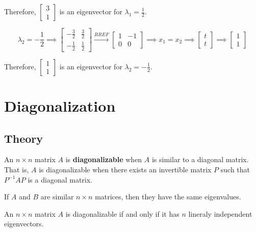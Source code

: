 \documentclass{report}
\begin{document}
\noindent Therefore, $\begin{bmatrix} 3 \\ 1 \end{bmatrix}$ is an eigenvector for $\lambda_1 = \frac{1}{2}$.

$$
\lambda_2 = -\frac{1}{2} \implies \begin{bmatrix} -\frac{3}{2} & \frac{3}{2} \\ -\frac{1}{2} & \frac{1}{2} \end{bmatrix} \xrightarrow{RREF} \begin{bmatrix} 1 & -1 \\ 0 & 0 \end{bmatrix} \implies x_1 = x_2 \implies \begin{bmatrix} t \\ t \end{bmatrix} \implies \begin{bmatrix} 1 \\ 1 \end{bmatrix} 
$$

\noindent Therefore, $\begin{bmatrix} 1 \\ 1 \end{bmatrix}$ is an eigenvector for $\lambda_2 = -\frac{1}{2}$.

\section{Diagonalization}

\subsection{Theory}

\begin{tcolorbox}[title = Definition of a Diagonalizable Matrix]
	An $n \times n$ matrix $A$ is \textbf{diagonalizable} when $A$ is similar to a diagonal matrix. That is, $A$ is diagonalizable when there exists an invertible matrix $P$ such that $P^{-1} AP$ is a diagonal matrix.
\end{tcolorbox}

\begin{tcolorbox}[title = Similar Matrices Have the Same Eigenvalues]
	If $A$ and $B$ are similar $n \times n$ matrices, then they have the same eigenvalues.
\end{tcolorbox}

\begin{tcolorbox}[title = Condition for Diagonalization]
	An $n \times n$ matrix $A$ is diagonalizable if and only if it has $n$ lineraly independent eigenvectors. 
\end{tcolorbox}
\end{document}
